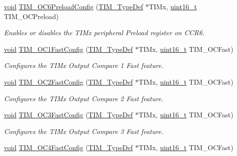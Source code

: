 \begin{DoxyCompactItemize}
\hyperlink{group___n_a_m_e_ga18028b8badbf1ea7e704ccac3c488e82}{void} \hyperlink{group___t_i_m___group2_ga88fd47900b03666a7297aa3f0c0bf8ff}{T\-I\-M\-\_\-\-O\-C6\-Preload\-Config} (\hyperlink{struct_t_i_m___type_def}{T\-I\-M\-\_\-\-Type\-Def} $\ast$T\-I\-Mx, \hyperlink{stdint_8h_a273cf69d639a59973b6019625df33e30}{uint16\-\_\-t} T\-I\-M\-\_\-\-O\-C\-Preload)
\begin{DoxyCompactList}\small\item\em Enables or disables the T\-I\-Mx peripheral Preload register on C\-C\-R6. \end{DoxyCompactList}\item 
\hyperlink{group___n_a_m_e_ga18028b8badbf1ea7e704ccac3c488e82}{void} \hyperlink{group___t_i_m___group2_gaec82031ca62f31f5483195c09752a83a}{T\-I\-M\-\_\-\-O\-C1\-Fast\-Config} (\hyperlink{struct_t_i_m___type_def}{T\-I\-M\-\_\-\-Type\-Def} $\ast$T\-I\-Mx, \hyperlink{stdint_8h_a273cf69d639a59973b6019625df33e30}{uint16\-\_\-t} T\-I\-M\-\_\-\-O\-C\-Fast)
\begin{DoxyCompactList}\small\item\em Configures the T\-I\-Mx Output Compare 1 Fast feature. \end{DoxyCompactList}\item 
\hyperlink{group___n_a_m_e_ga18028b8badbf1ea7e704ccac3c488e82}{void} \hyperlink{group___t_i_m___group2_ga413359c87f46c69f1ffe2dc8fb3a65e7}{T\-I\-M\-\_\-\-O\-C2\-Fast\-Config} (\hyperlink{struct_t_i_m___type_def}{T\-I\-M\-\_\-\-Type\-Def} $\ast$T\-I\-Mx, \hyperlink{stdint_8h_a273cf69d639a59973b6019625df33e30}{uint16\-\_\-t} T\-I\-M\-\_\-\-O\-C\-Fast)
\begin{DoxyCompactList}\small\item\em Configures the T\-I\-Mx Output Compare 2 Fast feature. \end{DoxyCompactList}\item 
\hyperlink{group___n_a_m_e_ga18028b8badbf1ea7e704ccac3c488e82}{void} \hyperlink{group___t_i_m___group2_gab2f3698e6e56bd9b0a4be7056ba789e1}{T\-I\-M\-\_\-\-O\-C3\-Fast\-Config} (\hyperlink{struct_t_i_m___type_def}{T\-I\-M\-\_\-\-Type\-Def} $\ast$T\-I\-Mx, \hyperlink{stdint_8h_a273cf69d639a59973b6019625df33e30}{uint16\-\_\-t} T\-I\-M\-\_\-\-O\-C\-Fast)
\begin{DoxyCompactList}\small\item\em Configures the T\-I\-Mx Output Compare 3 Fast feature. \end{DoxyCompactList}\item 
\hyperlink{group___n_a_m_e_ga18028b8badbf1ea7e704ccac3c488e82}{void} \hyperlink{group___t_i_m___group2_ga58279a04e8ea5333f1079d3cce8dde12}{T\-I\-M\-\_\-\-O\-C4\-Fast\-Config} (\hyperlink{struct_t_i_m___type_def}{T\-I\-M\-\_\-\-Type\-Def} $\ast$T\-I\-Mx, \hyperlink{stdint_8h_a273cf69d639a59973b6019625df33e30}{uint16\-\_\-t} T\-I\-M\-\_\-\-O\-C\-Fast)

\end{DoxyCompactItemize}
